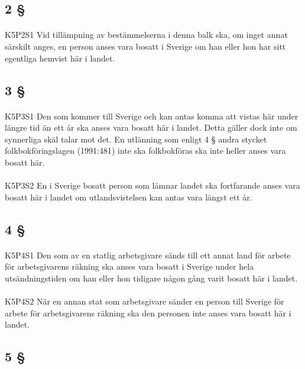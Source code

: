 \documentclass[a4paper,notitlepage,openany,10pt]{book}
\begin{document}
\subsection*{2 §}
\paragraph*{}
{\tiny K5P2S1}
Vid tillämpning av bestämmelserna i denna balk ska, om inget annat särskilt anges, en person anses vara bosatt i Sverige om han eller hon har sitt egentliga hemvist här i landet.
\subsection*{3 §}
\paragraph*{}
{\tiny K5P3S1}
Den som kommer till Sverige och kan antas komma att vistas här under längre tid än ett år ska anses vara bosatt här i landet. Detta gäller dock inte om synnerliga skäl talar mot det. En utlänning som enligt 4 § andra stycket folkbokföringslagen (1991:481) inte ska folkbokföras ska inte heller anses vara bosatt här.
\paragraph*{}
{\tiny K5P3S2}
En i Sverige bosatt person som lämnar landet ska fortfarande anses vara bosatt här i landet om utlandsvistelsen kan antas vara längst ett år.
\subsection*{4 §}
\paragraph*{}
{\tiny K5P4S1}
Den som av en statlig arbetsgivare sänds till ett annat land för arbete för arbetsgivarens räkning ska anses vara bosatt i Sverige under hela utsändningstiden om han eller hon tidigare någon gång varit bosatt här i landet.
\paragraph*{}
{\tiny K5P4S2}
När en annan stat som arbetsgivare sänder en person till Sverige för arbete för arbetsgivarens räkning ska den personen inte anses vara bosatt här i landet.
\subsection*{5 §}
\end{document}
